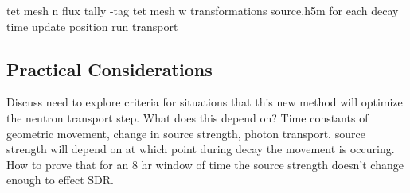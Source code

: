 tet mesh n flux tally
-tag tet mesh w transformations
source.h5m for each decay time
update position
run transport

\subsection{Practical Considerations}
Discuss need to explore criteria for situations that this new method will
optimize the neutron transport step.  What does this depend on?  Time constants
of geometric movement, change in source strength, photon transport.  source
strength will depend on at which point during decay the movement is occuring.
How to prove that for an 8 hr window of time the source strength doesn't change
enough to effect SDR.
